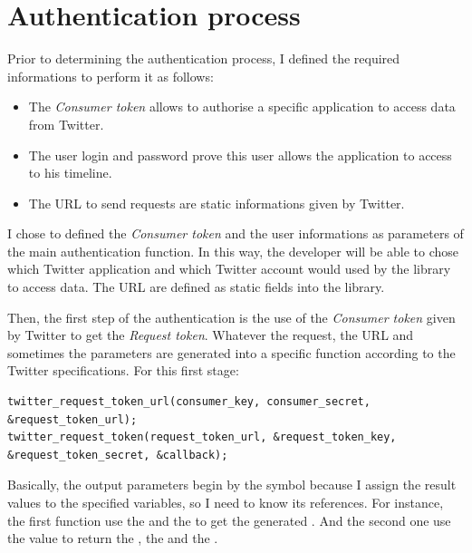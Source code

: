 \section{Authentication process}

\hspace{15mm}Prior to determining the authentication process, I defined the required informations to perform it as follows:
\begin{itemize}
\item The \textit{Consumer token} allows to authorise a specific application to access data from Twitter.
\item The user login and password prove this user allows the application to access to his timeline.
\item The URL to send requests are static informations given by Twitter.
\end{itemize}
I chose to defined the \textit{Consumer token} and the user informations as parameters of the main authentication function. In this way, the developer will be able to chose which Twitter application and which Twitter account would used by the library to access data. The URL are defined as static fields into the library.

Then, the first step of the authentication is the use of the \textit{Consumer token} given by Twitter to get the \textit{Request token}. Whatever the request, the URL and sometimes the parameters are generated into a specific function according to the Twitter specifications. For this first stage:
\begin{lstlisting}
twitter_request_token_url(consumer_key, consumer_secret, &request_token_url);
twitter_request_token(request_token_url, &request_token_key, &request_token_secret, &callback);
\end{lstlisting}
Basically, the output parameters begin by the \cfunction{\&} symbol because I assign the result values to the specified variables, so I need to know its references.
For instance, the first function use the  and the  to get the generated . And the second one use the  value to return the , the  and the .

